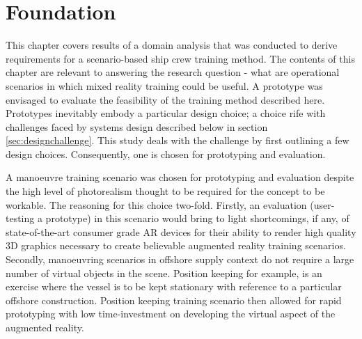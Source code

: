 \chapter{Foundation}
\label{chap:foundation}


%

This chapter covers results of a domain analysis that was conducted to derive requirements for a scenario-based ship crew training method. The contents of this chapter are relevant to answering the research question - what are operational scenarios in which mixed reality training could be useful. A prototype was envisaged to evaluate the feasibility of the training method described here. Prototypes inevitably embody a particular design choice; a choice rife with challenges faced by systems design described below in section \ref{sec:designchallenge}. This study deals with the challenge by first outlining a few design choices. Consequently, one is chosen for prototyping and evaluation. 

A manoeuvre training scenario was chosen for prototyping and evaluation despite the high level of photorealism thought to be required for the concept to be workable. The reasoning for this choice two-fold. Firstly, an evaluation (user-testing a prototype) in this scenario would bring to light shortcomings, if any, of state-of-the-art consumer grade AR devices for their ability to render high quality 3D graphics necessary to create believable augmented reality training scenarios. Secondly, manoeuvring scenarios in offshore supply context do not require a large number of virtual objects in the scene. Position keeping for example, is an exercise where the vessel is to be kept stationary with reference to a particular offshore construction. Position keeping training scenario then allowed for rapid prototyping with low time-investment on developing the virtual aspect of the augmented reality.

